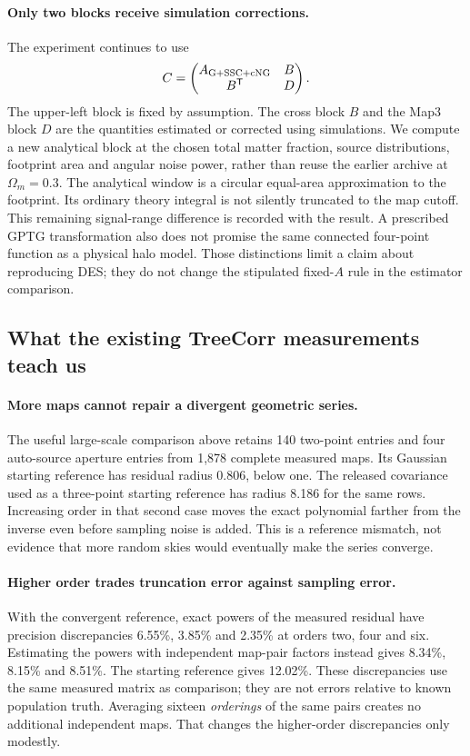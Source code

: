 \documentclass[11pt]{article}
\begin{document}
\paragraph{Only two blocks receive simulation corrections.}
The experiment continues to use
\begin{equation}
 C=\begin{pmatrix}A_{\rm G+SSC+cNG}&B\\B^{\mathsf T}&D\end{pmatrix}.
\end{equation}
The upper-left block is fixed by assumption. The cross block $B$ and the
Map3 block $D$ are the quantities estimated or corrected using simulations.
We compute a new analytical block at the chosen total matter fraction,
source distributions, footprint area and angular noise power, rather than
reuse the earlier archive at $\Omega_m=0.3$. The analytical window is
a circular equal-area approximation to the footprint. Its ordinary theory integral
is not silently truncated to the map cutoff. This remaining signal-range
difference is recorded with the result. A prescribed GPTG transformation
also does not promise the same connected four-point function as a physical
halo model. Those distinctions limit a claim about reproducing DES; they
do not change the stipulated fixed-$A$ rule in the estimator comparison.

\subsection{What the existing TreeCorr measurements teach us}
\paragraph{More maps cannot repair a divergent geometric series.}
The useful large-scale comparison above retains 140 two-point entries
and four auto-source aperture entries from 1,878 complete measured maps.
Its Gaussian starting reference has residual radius 0.806, below one.
The released covariance used as a three-point starting reference has
radius 8.186 for the same rows. Increasing order in that second case
moves the exact polynomial farther from the inverse even before sampling
noise is added. This is a reference mismatch, not evidence that more
random skies would eventually make the series converge.

\paragraph{Higher order trades truncation error against sampling error.}
With the convergent reference, exact powers of the measured residual
have precision discrepancies 6.55\%, 3.85\% and 2.35\% at orders two,
four and six. Estimating the powers with independent map-pair factors
instead gives 8.34\%, 8.15\% and 8.51\%. The starting reference gives
12.02\%. These discrepancies use the same measured matrix as comparison;
they are not errors relative to known population truth. Averaging sixteen \emph{orderings} of the same pairs creates no
additional independent maps. That changes
the higher-order discrepancies only modestly.
\end{document}
